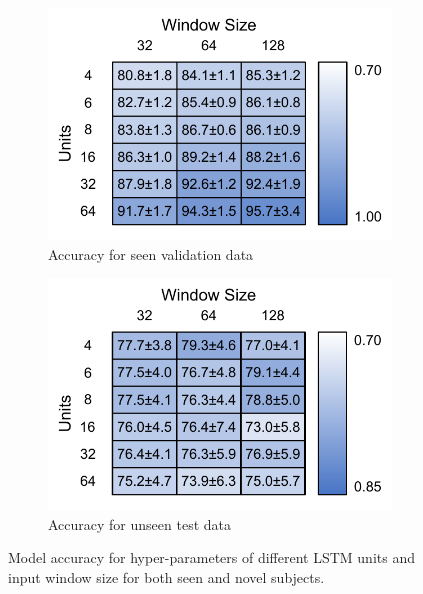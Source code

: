 \begin{figure}[!hbt]
    \centering
    \begin{subfigure}{.4\linewidth}
        \centering
        \includegraphics[width=\textwidth]{content/4-LSTM_Behaviour/results/window_v_units_train.pdf}
	 \caption{Accuracy for seen validation data}
        \label{fig:model_size_hyper_param_train}
    \end{subfigure}
    \begin{subfigure}{.4\linewidth}
        \centering
        \includegraphics[width=\textwidth]{content/4-LSTM_Behaviour/results/window_v_units_test.pdf}
        \caption{Accuracy for unseen test data}
        \label{fig:model_size_hyper_param_test}
    \end{subfigure}
    \caption[Model accuracy for hyper-parameters of different LSTM hyper-parameter]{Model accuracy for hyper-parameters of different LSTM units and input window size for both seen and novel subjects.}
\label{fig:model_size_hyper_param}
\end{figure}

